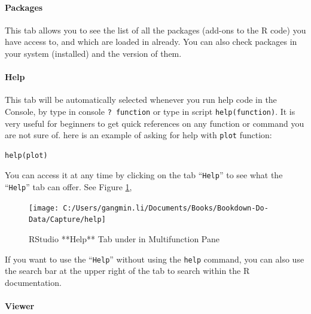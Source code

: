 \documentclass[
]{book}
\begin{document}
\hypertarget{packages}{%
\paragraph{\texorpdfstring{\textbf{Packages}}{Packages}}\label{packages}}

This tab allows you to see the list of all the packages (add-ons to the R code) you have access to, and which are loaded in already. You can also check packages in your system (installed) and the version of them.

\hypertarget{help}{%
\paragraph{\texorpdfstring{\textbf{Help}}{Help}}\label{help}}

This tab will be automatically selected whenever you run help code in the Console, by type in console \texttt{?\ function} or type in script \texttt{help(function)}. It is very useful for beginners to get quick references on any function or command you are not sure of. here is an example of asking for help with \texttt{plot} function:

\begin{verbatim}
help(plot)
\end{verbatim}

You can access it at any time by clicking on the tab ``\texttt{Help}'' to see what the ``\texttt{Help}'' tab can offer. See Figure \ref{fig:help},

\begin{figure}

{\centering \texttt{[image: C:/Users/gangmin.li/Documents/Books/Bookdown-Do-Data/Capture/help]} 

}

\caption{RStudio **Help** Tab under in Multifunction Pane}\label{fig:help}
\end{figure}

If you want to use the ``\texttt{Help}'' without using the \texttt{help} command, you can also use the search bar at the upper right of the tab to search within the R documentation.

\hypertarget{viewer}{%
\paragraph{\texorpdfstring{\textbf{Viewer}}{Viewer}}\label{viewer}}
\end{document}
